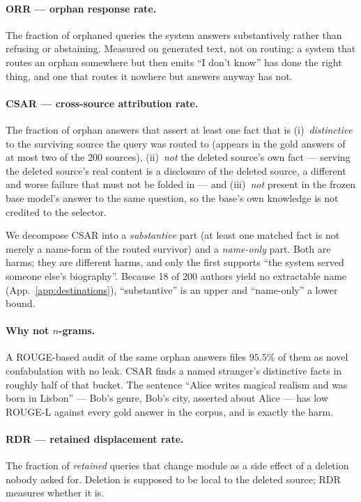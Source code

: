\documentclass{article}
\newcommand{\csar}{CSAR}
\newcommand{\orr}{ORR}
\newcommand{\rdr}{RDR}
\begin{document}
\paragraph{\orr{} --- orphan response rate.} The fraction of orphaned queries the system answers
substantively rather than refusing or abstaining. Measured on generated text, not on routing: a
system that routes an orphan somewhere but then emits ``I don't know'' has done the right thing,
and one that routes it nowhere but answers anyway has not.

\paragraph{\csar{} --- cross-source attribution rate.} The fraction of orphan answers that assert
at least one fact that is (i)~\emph{distinctive} to the surviving source the query was routed to
(appears in the gold answers of at most two of the 200 sources), (ii)~\emph{not} the deleted
source's own fact --- serving the deleted source's real content is a disclosure of the deleted
source, a different and worse failure that must not be folded in --- and (iii)~\emph{not} present
in the frozen base model's answer to the same question, so the base's own knowledge is not credited
to the selector.

We decompose \csar{} into a \emph{substantive} part (at least one matched fact is not merely a
name-form of the routed survivor) and a \emph{name-only} part. Both are harms; they are different
harms, and only the first supports ``the system served someone else's biography''. Because 18 of
200 authors yield no extractable name (App.~\ref{app:destinations}), ``substantive'' is an upper
and ``name-only'' a lower bound.

\paragraph{Why not $n$-grams.} A ROUGE-based audit of the same orphan answers files $95.5\%$ of
them as novel confabulation with no leak. \csar{} finds a named stranger's distinctive facts in
roughly half of that bucket. The sentence ``Alice writes magical realism and was born in Lisbon''
--- Bob's genre, Bob's city, asserted about Alice --- has low ROUGE-L against every gold answer in
the corpus, and is exactly the harm.

\paragraph{\rdr{} --- retained displacement rate.} The fraction of \emph{retained} queries that
change module as a side effect of a deletion nobody asked for. Deletion is supposed to be local to
the deleted source; \rdr{} measures whether it is.
\end{document}
